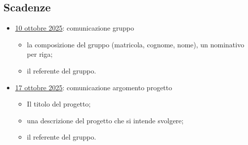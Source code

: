 \subsection{Scadenze}
\begin{itemize}
    \item \underline{10 ottobre 2025}: comunicazione gruppo
    \begin{itemize}
        \item la composizione del gruppo (matricola, cognome, nome), un nominativo per riga;
        \item il referente del gruppo.
    \end{itemize}
    \item \underline{17 ottobre 2025}: comunicazione argomento progetto
    \begin{itemize}
        \item Il titolo del progetto;
        \item una descrizione del progetto che si intende svolgere;
        \item il referente del gruppo.
    \end{itemize}
\end{itemize}

